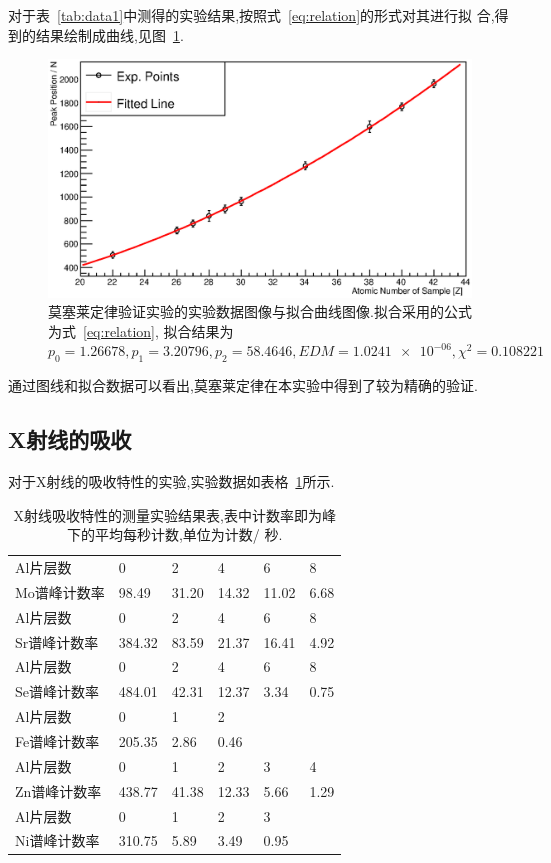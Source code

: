 \documentclass[aps,pre,12pt,preprint,onecolumn,showpacs,showkeys]{revtex4-1}
\begin{document}
对于表~\ref{tab:data1}中测得的实验结果,按照式~\ref{eq:relation}的形式对其进行拟
合,得到的结果绘制成曲线,见图~\ref{fig:res}.


\begin{figure}[htbp]
  \centering
\includegraphics[width=\textwidth]{c1.eps}
\caption{\label{fig:res}%
    莫塞莱定律验证实验的实验数据图像与拟合曲线图像.拟合采用的公式为式~\ref{eq:relation},
    拟合结果为$p_0 = 1.26678, p_1 = 3.20796, p_2 = 58.4646, EDM =
    \num{1.0241e-06},
    \chi^2 = 0.108221$
}
\end{figure}

通过图线和拟合数据可以看出,莫塞莱定律在本实验中得到了较为精确的验证.

\subsection{X射线的吸收}

对于X射线的吸收特性的实验,实验数据如表格~\ref{tab:data2}所示.

\begin{table}[htbp]
  \caption{\label{tab:data2}
      X射线吸收特性的测量实验结果表,表中计数率即为峰下的平均每秒计数,单位为计数/
      秒.
  }
\begin{ruledtabular}
  \begin{tabular}{llllll}
      Al片层数 & 0 & 2 & 4& 6& 8 \\
      Mo谱峰计数率 &98.49 & 31.20 &14.32&11.02&6.68 \\
    \colrule
      Al片层数 & 0 & 2 & 4& 6& 8 \\
      Sr谱峰计数率 &384.32 & 83.59 &21.37&16.41&4.92 \\
      \colrule
      Al片层数 & 0 & 2 & 4& 6& 8 \\
      Se谱峰计数率 &484.01 &42.31 &12.37 &3.34 &0.75 \\
      \colrule
      Al片层数 & 0 & 1 & 2& &  \\
      Fe谱峰计数率 &205.35 &2.86 &0.46 & & \\
      \colrule
      Al片层数 & 0 & 1 & 2& 3 & 4  \\
      Zn谱峰计数率 &438.77 &41.38 &12.33 &5.66 &1.29 \\
      \colrule
      Al片层数 & 0 & 1 & 2&3 &  \\
      Ni谱峰计数率 &310.75 &5.89 &3.49 &0.95 & 
\end{tabular}
\end{ruledtabular}
\end{table}
\end{document}
